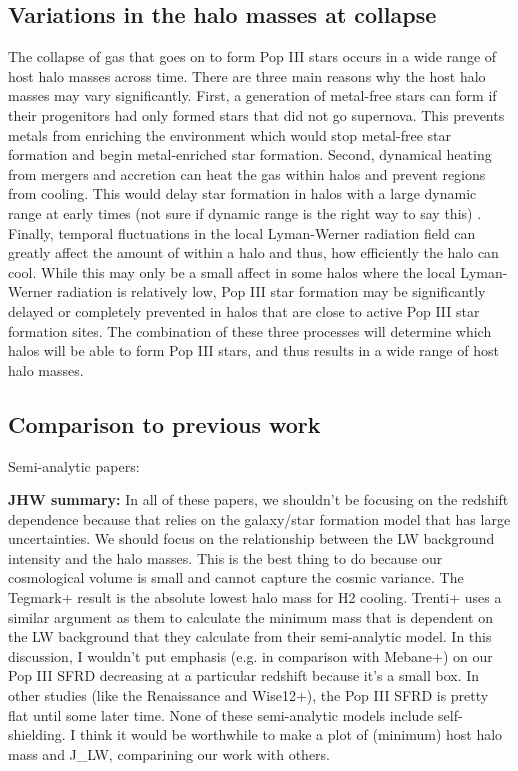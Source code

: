 \documentclass[a4paper,fleqn,usenatbib]{mnras}
\begin{document}
\subsection{Variations in the halo masses at collapse}
The collapse of gas that goes on to form Pop III stars occurs in a wide range of host halo masses across time. There are three main reasons why the host halo masses may vary significantly. First, a generation of metal-free stars can form if their progenitors had only formed stars that did not go supernova. This prevents metals from enriching the environment which would stop metal-free star formation and begin metal-enriched star formation. Second, dynamical heating from mergers and accretion can heat the gas within halos and prevent \hh{} regions from cooling. This would delay star formation in halos with a large dynamic range at early times (not sure if dynamic range is the right way to say this) \citep{Yoshida03}. Finally, temporal fluctuations in the local Lyman-Werner radiation field can greatly affect the amount of \hh{} within a halo and thus, how efficiently the halo can cool. While this may only be a small affect in some halos where the local Lyman-Werner radiation is relatively low, Pop III star formation may be significantly delayed or completely prevented in halos that are close to active Pop III star formation sites. The combination of these three processes will determine which halos will be able to form Pop III stars, and thus results in a wide range of host halo masses. 


\subsection{Comparison to previous work}

\li Semi-analytic papers: \citep{Tegmark97, Trenti09, Visbal18,
  Mebane18, Griffen18}

\noindent\textbf{JHW summary:} In all of these papers, we shouldn't be focusing on the redshift dependence because that relies on the galaxy/star formation model that has large uncertainties.  We should focus on the relationship between the LW background intensity and the halo masses.  This is the best thing to do because our cosmological volume is small and cannot capture the cosmic variance.  The Tegmark+ result is the absolute lowest halo mass for H2 cooling.  Trenti+ uses a similar argument as them to calculate the minimum mass that is dependent on the LW background that they calculate from their semi-analytic model.  In this discussion, I wouldn't put emphasis (e.g. in comparison with Mebane+) on our Pop III SFRD decreasing at a particular redshift because it's a small box.  In other studies (like the Renaissance and Wise12+), the Pop III SFRD is pretty flat until some later time.  None of these semi-analytic models include self-shielding.  I think it would be worthwhile to make a plot of (minimum) host halo mass and J\_LW, comparining our work with others.
\end{document}
